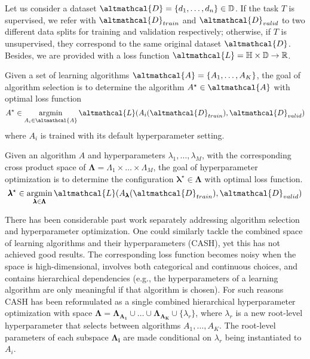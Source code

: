 Let us consider a dataset $\altmathcal{D} = \{d_1, \dots, d_n\} \in \mathbb{D}$.
If the task $T$ is supervised, we refer with $\altmathcal{D}_{train}$ and $\altmathcal{D}_{valid}$ to two different data splits for training and validation respectively; otherwise, if $T$ is unsupervised, they correspond to the same original dataset $\altmathcal{D}$.
Besides, we are provided with a loss function $\altmathcal{L} = \mathbb{H} \times \mathbb{D} \rightarrow \mathbb{R}$.

\begin{definition}
    Given a set of learning algorithms $\altmathcal{A} = \{A_1, \dots, A_K\}$, the goal of algorithm selection is to determine the algorithm $A^{\star} \in \altmathcal{A}$ with optimal loss function
    \begin{equation*}
        A^{\star} \in \argmin_{A_i \in \altmathcal{A}} \altmathcal{L}(A_i(\altmathcal{D}_{train}), \altmathcal{D}_{valid})
    \end{equation*}
    where $A_i$ is trained with its default hyperparameter setting.
\end{definition}

\begin{definition}
    Given an algorithm $A$ and hyperparameters $\lambda_1, \dots, \lambda_M$, with the corresponding cross product space of $\pmb{\Lambda} = \Lambda_1 \times \dots \times \Lambda_M$, the goal of hyperparameter optimization is to determine the configuration $\pmb{\lambda}^{\star} \in \pmb{\Lambda}$ with optimal loss function.
    \begin{equation*}
        \pmb{\lambda}^{\star} \in \argmin_{\pmb{\lambda} \in \pmb{\Lambda}} \altmathcal{L}(A_{\pmb{\lambda}}(\altmathcal{D}_{train}), \altmathcal{D}_{valid})
    \end{equation*}
\end{definition}

There has been considerable past work separately addressing algorithm selection and hyperparameter optimization.
One could similarly tackle the combined space of learning algorithms and their hyperparameters (CASH), yet this has not achieved good results.
The corresponding loss function becomes noisy when the space is high-dimensional, involves both categorical and continuous choices, and contains hierarchical dependencies (e.g., the hyperparameters of a learning algorithm are only meaningful if that algorithm is chosen).
For such reasons CASH has been reformulated as a single combined hierarchical hyperparameter optimization with space $\pmb{\Lambda} = \pmb{\Lambda_{A_1}} \cup \dots \cup \pmb{\Lambda_{A_K}} \cup \{\lambda_r\}$, where $\lambda_r$ is a new root-level hyperparameter that selects between algorithms $A_1, \dots, A_K$.
The root-level parameters of each subspace $\pmb{\Lambda_i}$ are made conditional on $\lambda_r$ being instantiated to $A_i$.

